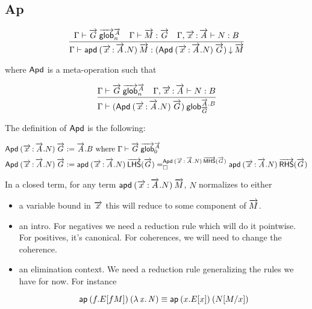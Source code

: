 \subsection{Ap}

\begin{small}
  \[\infer{\ofdepglob{\Gamma}{\apd{(\teltm xA.N)}{\tel M}}
    {(\Apd{(\teltm xA.N)}{\tel G})}{\tel M}}
  {\wfglob{\Gamma}{\tel G}{\tel A}n
    & \ofglob{\Gamma}{\tel M}{\tel G}
    & \ofglob{\Gamma,\teltm xA}{N}{B}}\]

  where $\mathsf{Apd}$ is a meta-operation such that

  \[\infer{\wfdepglob{\Gamma}{(\Apd{(\teltm xA.N)}{\tel G})}
    {\tel A.B}{\tel G}}
  {\wfglob{\Gamma}{\tel G}{\tel A}n
    & \ofglob{\Gamma,\teltm xA}{N}{B}}\]

  The definition of $\mathsf{Apd}$ is the following:

\[\begin{aligned}
  \mathsf{Apd} \: {(\overrightarrow{x}\, {:}\, \overrightarrow{A}.N)} \: {\overrightarrow{G}} & := \overrightarrow{A}.B
  \text{ where ${\Gamma} \vdash {\ensuremath{\overrightarrow{G}}} \: \overrightarrow{\mathsf{glob}}^{\overrightarrow{A}}_{0}$} \\
  \mathsf{Apd} \: {(\overrightarrow{x}\, {:}\, \overrightarrow{A}.N)} \: {\overrightarrow{G}} & := 
    \mathsf{apd} \: {(\overrightarrow{x}\, {:}\, \overrightarrow{A}.N)} \: {\overrightarrow{\mathsf{LHS}}(\overrightarrow{G})} =^{\mathsf{Apd} \: {(\overrightarrow{x}\, {:}\, \overrightarrow{A}.N)} \: {\overrightarrow{\mathsf{MHS}}(\overrightarrow{G})}}_{\square} \mathsf{apd} \: {(\overrightarrow{x}\, {:}\, \overrightarrow{A}.N)} \: {\overrightarrow{\mathsf{RHS}}(\overrightarrow{G})}
\end{aligned}\]
\end{small}


In a closed term, for any term $\mathsf{apd} \: {(\overrightarrow{x}\, {:}\, \overrightarrow{A}.N)} \: {\overrightarrow{M}}$, $N$ normalizes to
either
\begin{itemize}
\item a variable bound in $\overrightarrow{x}$ this will reduce to some component of
  $\overrightarrow{M}$.
\item an intro. For negatives we
  need a reduction rule which will do it pointwise. For positives, it’s
  canonical. For coherences, we will need to change the coherence.
\item an elimination context. We need a reduction rule generalizing the rules we
  have for now. For instance

\[\mathsf{ap} \: {(f.E[f M])} \: {(\mathit{\lambda\,x.\,N})} \equiv \mathsf{ap} \: {(x.E[x])} \: {(N [ M / x])}\]

\end{itemize}



